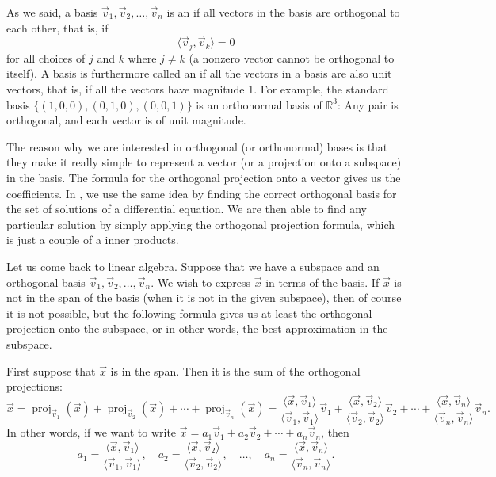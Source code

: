 As we said, a basis $\vec{v}_1,\vec{v}_2,\ldots,\vec{v}_n$
is an \emph{} if all vectors in the
basis are orthogonal to each other, that is, if
\begin{equation*}
\langle \vec{v}_j , \vec{v}_k \rangle = 0
\end{equation*}
for all choices of $j$ and $k$ where $j \not= k$ (a nonzero vector cannot be
orthogonal to itself).
A basis is furthermore called an \emph{} if all
the vectors in a basis are also unit vectors, that is, if all the vectors
have magnitude 1.
For example, the standard basis $\{ (1,0,0), (0,1,0), (0,0,1) \}$ is an
orthonormal basis of ${\mathbb{R}}^3$:
Any pair is orthogonal, and each vector is of unit
magnitude.

The reason why we are interested in orthogonal (or orthonormal) bases is
that they make it really simple to represent a vector (or a projection onto
a subspace) in the basis.  The formula for the orthogonal projection
onto a vector gives us the coefficients.  In 
, we use the same idea by finding the correct 
orthogonal basis for the set of solutions of a differential equation.
We are then able to find any particular solution by simply applying the
orthogonal projection formula, which is just a couple of a inner products.

Let us come back to linear algebra.  Suppose that we have a subspace
and an orthogonal
basis $\vec{v}_1, \vec{v}_2, \ldots, \vec{v}_n$.  We wish to
express $\vec{x}$ in terms of the basis.  If $\vec{x}$ is not in the span
of the basis (when it is not in the given subspace),
then of course it is not possible,
but the following formula
gives us at least the orthogonal projection onto the subspace,
or in other words, the best approximation in the subspace.

First suppose that $\vec{x}$ is in the span.  Then it is the sum of the
orthogonal projections:
\begin{equation*}
\vec{x} = 
\operatorname{proj}_{\vec{v}_1} ( \vec{x} )
+
\operatorname{proj}_{\vec{v}_2} ( \vec{x} )
+
\cdots
+
\operatorname{proj}_{\vec{v}_n} ( \vec{x} )
=
\frac{\langle \vec{x}, \vec{v}_1 \rangle}{
\langle \vec{v}_1, \vec{v}_1 \rangle
}
\vec{v}_1
+
\frac{\langle \vec{x}, \vec{v}_2 \rangle}{
\langle \vec{v}_2, \vec{v}_2 \rangle
}
\vec{v}_2
+
\cdots
+
\frac{\langle \vec{x}, \vec{v}_n \rangle}{
\langle \vec{v}_n, \vec{v}_n \rangle
}
\vec{v}_n .
\end{equation*}
In other words, if we want to write
$\vec{x} =
a_1 \vec{v}_1 + 
a_2 \vec{v}_2 + \cdots +
a_n \vec{v}_n$, then
\begin{equation*}
a_1 = 
\frac{\langle \vec{x}, \vec{v}_1 \rangle}{
\langle \vec{v}_1, \vec{v}_1 \rangle
} , \quad
a_2 = 
\frac{\langle \vec{x}, \vec{v}_2 \rangle}{
\langle \vec{v}_2, \vec{v}_2 \rangle
} , \quad \ldots , \quad
a_n = 
\frac{\langle \vec{x}, \vec{v}_n \rangle}{
\langle \vec{v}_n, \vec{v}_n \rangle
} .
\end{equation*}

